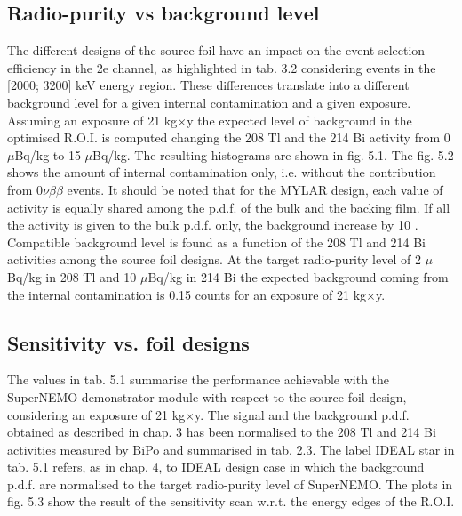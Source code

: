 \documentclass[main.tex]{subfiles}
\begin{document}
\subsection{Radio-purity vs background level}


\NI The different designs of the source foil have an impact on the event selection efficiency in the 2e channel, as highlighted in tab. 3.2 considering events in the [2000; 3200] keV energy region. These differences translate into a different background level for a given internal contamination and a given exposure. Assuming an exposure of 21 kg$\times$y the expected level of background in the optimised R.O.I. is computed changing the 208 Tl and the 214 Bi activity from 0 $\mu$Bq/kg to 15 $\mu$Bq/kg. The resulting histograms are shown in fig. 5.1. The fig. 5.2 shows the amount of internal contamination only, i.e. without the contribution from 0$\nu\beta\beta$ events. It should be noted that for the MYLAR design, each value of activity is equally shared among the p.d.f. of the bulk and the backing film. If all the activity is given to the bulk p.d.f. only, the background increase by 10 . Compatible background level is found as a function of the 208 Tl and 214 Bi activities among the source foil designs. At the target radio-purity level of 2 $\mu$Bq/kg in 208 Tl and 10 $\mu$Bq/kg in 214 Bi the expected background coming from the internal contamination is 0.15 counts for an exposure of 21 kg$\times$y.


\subsection{Sensitivity vs. foil designs}


\NI The values in tab. 5.1 summarise the performance achievable with the SuperNEMO demonstrator module with respect to the source foil design, considering an exposure of 21 kg$\times$y. The signal and the background p.d.f. obtained as described in chap. 3 has been normalised to the 208 Tl and 214 Bi activities measured by BiPo and summarised in tab. 2.3. The label IDEAL star in tab. 5.1 refers, as in chap. 4, to IDEAL design case in which the background p.d.f. are normalised to the target radio-purity level of SuperNEMO. The plots in fig. 5.3 show the result of the sensitivity scan w.r.t. the energy edges of the R.O.I.
\end{document}
